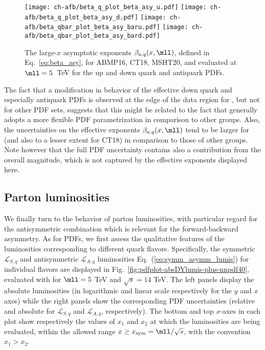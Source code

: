 \begin{figure}[!t]
 \centering
 \texttt{[image: ch-afb/beta\_q\_plot\_beta\_asy\_u.pdf]}
 \texttt{[image: ch-afb/beta\_q\_plot\_beta\_asy\_d.pdf]}
 \texttt{[image: ch-afb/beta\_qbar\_plot\_beta\_asy\_baru.pdf]}
 \texttt{[image: ch-afb/beta\_qbar\_plot\_beta\_asy\_bard.pdf]}
 \caption{\small The large-$x$ asymptotic exponents $\beta_{a,q}(x,\mll)$, defined
   in Eq.~\eqref{eq:beta_asy},
   for ABMP16, CT18, MSHT20, and  evaluated at $\mll=5$~TeV
   for the up and down quark and antiquark PDFs.}    
 \label{fig:asy_exponents}
\end{figure}

The fact that a modification in behavior of the effective down quark
and especially antiquark PDFs is observed at the edge of the data
region for , but not for other PDF sets, suggests that this
might be related to the fact that   generally adopts a more
flexible PDF parametrization in comparison to other groups.
%
Also, the  uncertainties on the effective exponents
$\beta_{a,q}(x,\mll)$ tend to be larger for  (and also to a
lesser extent for CT18) in comparison to those of other groups.
Note however that the full PDF uncertainty contains also a
contribution from the overall 
magnitude, which is not captured by the effective exponents displayed here.

\subsection{Parton luminosities}
\label{subsec:partoniclumis}

We finally turn to the behavior of parton luminosities, with
particular regard for the antisymmetric combination which is relevant
for the forward-backward asymmetry.
As for PDFs, we first assess the qualitative features of the
luminosities corresponding to different quark flavors.
Specifically, the symmetric $\mathcal{L}_{S,q}$ and antisymmetric
$\mathcal{L}_{A,q}$ luminosities
Eq.~(\ref{eq:symm_asymm_lumis})  for individual flavors are
displayed in Fig.~\ref{fig:pdfplot-absDYlumis-plus-nnpdf40},
evaluated with  \nnlo for $\mll=5$ TeV and $\sqrt{s}=14$ TeV.
%
The left panels display the absolute luminosities (in logarithmic and
linear scale respectively
for the $y$ and $x$ axes)
while the right panels show the corresponding PDF uncertainties (relative and absolute for
$\mathcal{L}_{S,q}$ and $\mathcal{L}_{A,q}$, respectively).
%
The bottom  and top $x$-axes in each plot show respectively the values
of $x_1$ and $x_2$  at which the
luminosities are being evaluated, within the allowed range
$x \ge x_{\rm sym}=\mll/\sqrt{s}$, with the convention $x_1>x_2$.

